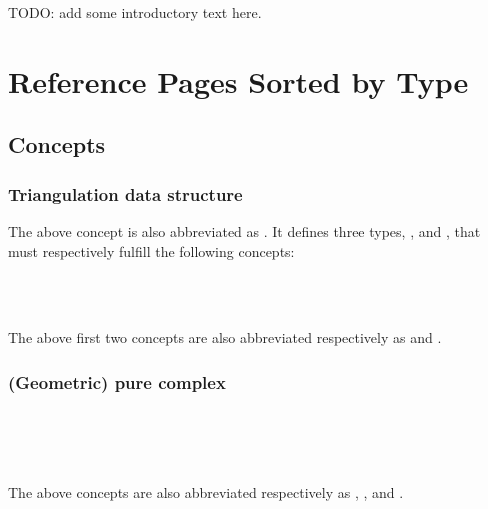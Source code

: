 

TODO: add some introductory text here.

\section{Reference Pages Sorted by Type}

\subsection*{Concepts}

\subsubsection*{Triangulation data structure}


The above concept is also abbreviated as . It defines three types,
,  and , that must respectively fulfill the
following concepts:

\\
\\

The above first two concepts are also abbreviated respectively as
 and .

\subsubsection*{(Geometric) pure complex}

\\
\\

\\

The above concepts are also abbreviated respectively as ,
, 
  and .


